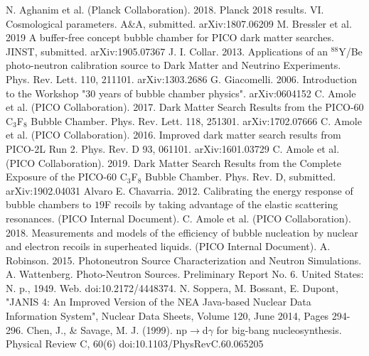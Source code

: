 \documentclass[%
12pt,
twoside,
reprint,
amsmath,amssymb,
aps,
]{article}
\begin{document}
	\pagebreak
	\begin{thebibliography}{1}
		\footnotesize
		 N. Aghanim et al. (Planck Collaboration). 2018. Planck 2018 results. VI. Cosmological parameters. A\&A, submitted. arXiv:1807.06209
		 M. Bressler et al. 2019 A buffer-free concept bubble chamber for PICO dark matter searches. JINST, submitted. arXiv:1905.07367
		 J. I. Collar. 2013. Applications of an $^{88}$Y/Be photo-neutron calibration source
		to Dark Matter and Neutrino Experiments. Phys. Rev. Lett. 110, 211101. arXiv:1303.2686
		 G. Giacomelli. 2006. Introduction to the Workshop "30 years of bubble chamber physics". arXiv:0604152
		 C. Amole et al. (PICO Collaboration). 2017. Dark Matter Search Results from the PICO-60 C$_{3}$F$_{8}$ Bubble Chamber. Phys. Rev. Lett. 118, 251301. arXiv:1702.07666 
		 C. Amole et al. (PICO Collaboration). 2016. Improved dark matter search results from PICO-2L Run 2. Phys. Rev. D 93, 061101. arXiv:1601.03729
		 C. Amole et al. (PICO Collaboration). 2019. Dark Matter Search Results from the  Complete Exposure of the PICO-60 C$_{3}$F$_{8}$ Bubble Chamber. Phys. Rev. D, submitted. arXiv:1902.04031 
		 Alvaro E. Chavarria. 2012. Calibrating the energy response of bubble chambers to ${19}$F recoils by taking advantage of the elastic scattering resonances. (PICO Internal Document).
		 C. Amole et al. (PICO Collaboration). 2018. Measurements and models of the efficiency of bubble nucleation by nuclear and electron recoils in superheated liquids. (PICO Internal Document).
		 A. Robinson. 2015. Photoneutron Source Characterization and Neutron Simulations.
		 A. Wattenberg. Photo-Neutron Sources. Preliminary Report No. 6. United States: N. p., 1949. Web. doi:10.2172/4448374.
		 N. Soppera, M. Bossant, E. Dupont, "JANIS 4: An Improved Version of the NEA Java-based Nuclear Data Information System", Nuclear Data Sheets, Volume 120, June 2014, Pages 294-296.
		 Chen, J., \& Savage, M. J. (1999). np$\rightarrow$d$\gamma$ for big-bang nucleosynthesis. Physical Review C, 60(6) doi:10.1103/PhysRevC.60.065205
		
	\end{thebibliography}
	\normalsize
\end{document}
